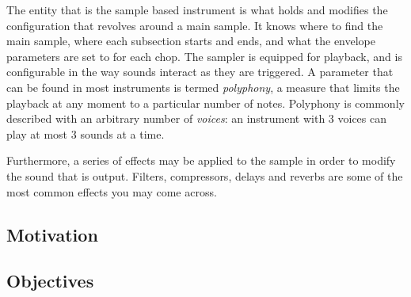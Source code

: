 \documentclass[12pt, a4paper, hidelinks]{article}
\begin{document}
	The entity that is the sample based instrument is what holds and modifies the configuration that revolves around a main sample. It knows where to find the main sample, where each subsection starts and ends, and what the envelope parameters are set to for each chop. The sampler is equipped for playback, and is configurable in the way sounds interact as they are triggered. A parameter that can be found in most instruments is termed \textit{polyphony}, a measure that limits the playback at any moment to a particular number of notes. Polyphony is commonly described with an arbitrary number of \textit{voices}: an instrument with 3 voices can play at most 3 sounds at a time.
	
	

 	Furthermore, a series of effects may be applied to the sample in order to modify the sound that is output. Filters, compressors, delays and reverbs are some of the most common effects you may come across. %
	
	
	\newpage
	\subsection{Motivation}
	
	
	

	\newpage
	\subsection{Objectives}

		
	
	\newpage	
\end{document}
